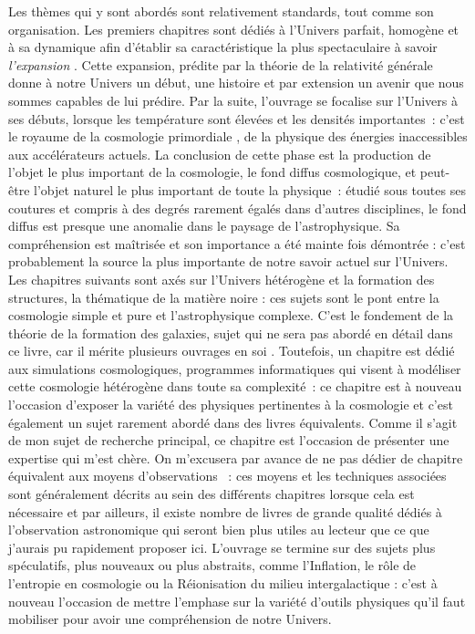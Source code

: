 Les thèmes qui y sont abordés sont relativement standards, tout comme son organisation. Les premiers chapitres sont dédiés à l'Univers parfait, homogène et à sa dynamique afin d'établir sa caractéristique la plus spectaculaire à savoir \textit{l'expansion} . Cette expansion, prédite par la théorie de la relativité générale donne à notre Univers un début, une histoire et par extension un avenir que nous sommes capables de lui prédire. Par la suite, l'ouvrage se focalise sur l'Univers à ses débuts, lorsque les température sont élevées et les densités importantes~: c'est le royaume de la cosmologie primordiale , de la physique des énergies inaccessibles aux accélérateurs actuels. La conclusion de cette phase est la production de l'objet le plus important de la cosmologie, le fond diffus cosmologique, et peut-être l'objet naturel le plus important de toute la physique~: étudié sous toutes ses coutures et compris à des degrés rarement égalés dans d'autres disciplines, le fond diffus est presque une anomalie dans le paysage de l'astrophysique. Sa compréhension est maîtrisée et son importance a été mainte fois démontrée : c'est probablement la source la plus importante de notre savoir actuel sur l'Univers. Les chapitres suivants sont axés sur l'Univers hétérogène et la formation des structures, la thématique de la matière noire : ces sujets sont le pont entre la cosmologie simple et pure et l'astrophysique complexe. C'est le fondement de la théorie de la formation des galaxies, sujet qui ne sera pas abordé en détail dans ce livre, car il mérite plusieurs ouvrages en soi . Toutefois, un chapitre est dédié aux simulations cosmologiques, programmes informatiques qui visent à modéliser cette cosmologie hétérogène dans toute sa complexité~: ce chapitre est à nouveau l'occasion d'exposer la variété des physiques pertinentes à la cosmologie et c'est également un sujet rarement abordé dans des livres équivalents. Comme il s'agit de mon sujet de recherche principal, ce chapitre est l'occasion de présenter une expertise qui m'est chère. On m'excusera par avance de ne pas dédier de chapitre équivalent aux moyens d'observations ~: ces moyens et les techniques associées sont généralement décrits au sein des différents chapitres lorsque cela est nécessaire et par ailleurs, il existe nombre de livres de grande qualité dédiés à l'observation astronomique qui seront bien plus utiles au lecteur que ce que j'aurais pu rapidement proposer ici. L'ouvrage se termine sur des sujets plus spéculatifs, plus nouveaux ou plus abstraits, comme l'Inflation, le rôle de l'entropie en cosmologie ou la Réionisation du milieu intergalactique : c'est à nouveau l'occasion de mettre l'emphase sur la variété d'outils physiques qu'il faut mobiliser pour avoir une compréhension de notre Univers.

